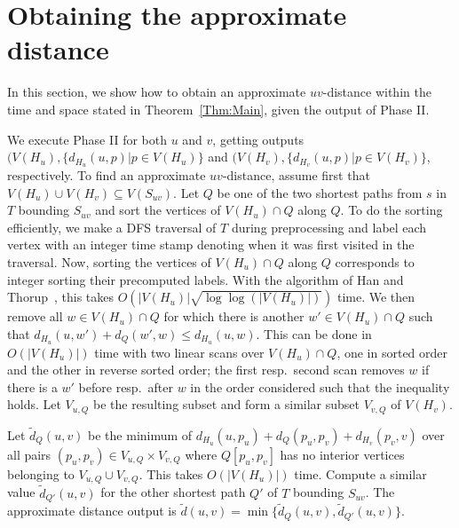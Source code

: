 \documentclass[11pt]{article}
\begin{document}
\section{Obtaining the approximate distance}\label{sec:ApproxDist}
In this section, we show how to obtain an approximate $uv$-distance within the time and space stated in Theorem~\ref{Thm:Main}, given the output of Phase II.

We execute Phase II for both $u$ and $v$, getting outputs $(V(H_u),\{d_{H_u}(u,p) | p\in V(H_u)\}$ and $(V(H_v),\{d_{H_v}(u,p) | p\in V(H_v)\}$, respectively. To find an approximate $uv$-distance, assume first that $V(H_u)\cup V(H_v)\subseteq V(S_{uv})$. Let $Q$ be one of the two shortest paths from $s$ in $T$ bounding $S_{uv}$ and sort the vertices of $V(H_u)\cap Q$ along $Q$. To do the sorting efficiently, we make a DFS traversal of $T$ during preprocessing and label each vertex with an integer time stamp denoting when it was first visited in the traversal. Now, sorting the vertices of $V(H_u)\cap Q$ along $Q$ corresponds to integer sorting their precomputed labels. With the algorithm of Han and Thorup~\cite{IntegerSorting}, this takes $O(|V(H_u)|\sqrt{\log\log(|V(H_u)|)})$ time. We then remove all $w\in V(H_u)\cap Q$ for which there is another $w'\in V(H_u)\cap Q$ such that $d_{H_u}(u,w') + d_Q(w',w) \leq d_{H_u}(u,w)$. This can be done in $O(|V(H_u)|)$ time with two linear scans over $V(H_u)\cap Q$, one in sorted order and the other in reverse sorted order; the first resp.~second scan removes $w$ if there is a $w'$ before resp.~after $w$ in the order considered such that the inequality holds. Let $V_{u,Q}$ be the resulting subset and form a similar subset $V_{v,Q}$ of $V(H_v)$.

Let $\tilde{d}_Q(u,v)$ be the minimum of $d_{H_u}(u,p_u) + d_Q(p_u,p_v) + d_{H_v}(p_v,v)$ over all pairs $(p_u,p_v)\in V_{u,Q}\times V_{v,Q}$ where $Q[p_u,p_v]$ has no interior vertices belonging to $V_{u,Q}\cup V_{v,Q}$. This takes $O(|V(H_u)|)$ time. Compute a similar value $\tilde{d}_{Q'}(u,v)$ for the other shortest path $Q'$ of $T$ bounding $S_{uv}$. The approximate distance output is $\tilde{d}(u,v) = \min\{\tilde{d}_Q(u,v),\tilde{d}_{Q'}(u,v)\}$.
\end{document}
